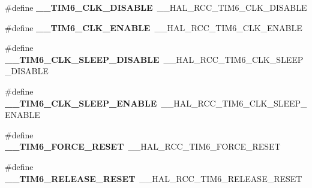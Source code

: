 \begin{DoxyCompactItemize}
\item 
\#define {\bfseries \+\_\+\+\_\+\+T\+I\+M6\+\_\+\+C\+L\+K\+\_\+\+D\+I\+S\+A\+B\+LE}~\+\_\+\+\_\+\+H\+A\+L\+\_\+\+R\+C\+C\+\_\+\+T\+I\+M6\+\_\+\+C\+L\+K\+\_\+\+D\+I\+S\+A\+B\+LE\hypertarget{group___h_a_l___r_c_c___aliased_ga16facf74d71ea54b2a9da63cffe0c99a}{}\label{group___h_a_l___r_c_c___aliased_ga16facf74d71ea54b2a9da63cffe0c99a}

\item 
\#define {\bfseries \+\_\+\+\_\+\+T\+I\+M6\+\_\+\+C\+L\+K\+\_\+\+E\+N\+A\+B\+LE}~\+\_\+\+\_\+\+H\+A\+L\+\_\+\+R\+C\+C\+\_\+\+T\+I\+M6\+\_\+\+C\+L\+K\+\_\+\+E\+N\+A\+B\+LE\hypertarget{group___h_a_l___r_c_c___aliased_gaa4a746941c7432e4c3cbf7530cbd0b36}{}\label{group___h_a_l___r_c_c___aliased_gaa4a746941c7432e4c3cbf7530cbd0b36}

\item 
\#define {\bfseries \+\_\+\+\_\+\+T\+I\+M6\+\_\+\+C\+L\+K\+\_\+\+S\+L\+E\+E\+P\+\_\+\+D\+I\+S\+A\+B\+LE}~\+\_\+\+\_\+\+H\+A\+L\+\_\+\+R\+C\+C\+\_\+\+T\+I\+M6\+\_\+\+C\+L\+K\+\_\+\+S\+L\+E\+E\+P\+\_\+\+D\+I\+S\+A\+B\+LE\hypertarget{group___h_a_l___r_c_c___aliased_ga03bbe3efed06a8df35996cb58c890af4}{}\label{group___h_a_l___r_c_c___aliased_ga03bbe3efed06a8df35996cb58c890af4}

\item 
\#define {\bfseries \+\_\+\+\_\+\+T\+I\+M6\+\_\+\+C\+L\+K\+\_\+\+S\+L\+E\+E\+P\+\_\+\+E\+N\+A\+B\+LE}~\+\_\+\+\_\+\+H\+A\+L\+\_\+\+R\+C\+C\+\_\+\+T\+I\+M6\+\_\+\+C\+L\+K\+\_\+\+S\+L\+E\+E\+P\+\_\+\+E\+N\+A\+B\+LE\hypertarget{group___h_a_l___r_c_c___aliased_ga0dd96378a8b3691ff2f29d93e80f4291}{}\label{group___h_a_l___r_c_c___aliased_ga0dd96378a8b3691ff2f29d93e80f4291}

\item 
\#define {\bfseries \+\_\+\+\_\+\+T\+I\+M6\+\_\+\+F\+O\+R\+C\+E\+\_\+\+R\+E\+S\+ET}~\+\_\+\+\_\+\+H\+A\+L\+\_\+\+R\+C\+C\+\_\+\+T\+I\+M6\+\_\+\+F\+O\+R\+C\+E\+\_\+\+R\+E\+S\+ET\hypertarget{group___h_a_l___r_c_c___aliased_ga24edb732ed2e5e6ac7724695b5f21954}{}\label{group___h_a_l___r_c_c___aliased_ga24edb732ed2e5e6ac7724695b5f21954}

\item 
\#define {\bfseries \+\_\+\+\_\+\+T\+I\+M6\+\_\+\+R\+E\+L\+E\+A\+S\+E\+\_\+\+R\+E\+S\+ET}~\+\_\+\+\_\+\+H\+A\+L\+\_\+\+R\+C\+C\+\_\+\+T\+I\+M6\+\_\+\+R\+E\+L\+E\+A\+S\+E\+\_\+\+R\+E\+S\+ET\hypertarget{group___h_a_l___r_c_c___aliased_gabdf7ef03c9de1208b413d09be54bbac7}{}\label{group___h_a_l___r_c_c___aliased_gabdf7ef03c9de1208b413d09be54bbac7}


\end{DoxyCompactItemize}
